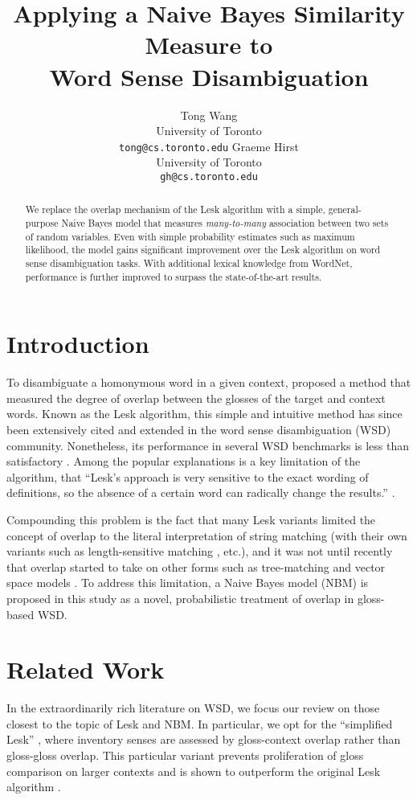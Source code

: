 \documentclass[11pt]{article}
\title{Applying a Naive Bayes Similarity Measure to\\Word Sense
  Disambiguation}
\author{Tong Wang \\
  University of Toronto\\
  {\tt tong@cs.toronto.edu} \And
  Graeme Hirst \\
  University of Toronto\\
  {\tt gh@cs.toronto.edu}}
\date{}
\begin{document}
\maketitle
\begin{abstract}
  We replace the overlap mechanism of the Lesk algorithm with a
  simple, general-purpose Naive Bayes model that measures
  \textit{many-to-many} association between two sets of random
  variables.  Even with simple probability estimates such as maximum
  likelihood, the model gains significant improvement over the Lesk
  algorithm on word sense disambiguation tasks. With additional
  lexical knowledge from WordNet, performance is further improved to
  surpass the state-of-the-art results.
\end{abstract}

\section{Introduction}
\label{sec:introduction}
To disambiguate a homonymous word in a given context,
\citet{lesk_automatic_1986} proposed a method that measured the degree
of overlap between the glosses of the target and context words.  Known
as the Lesk algorithm, this simple and intuitive method has since been
extensively cited and extended in the word sense disambiguation (WSD)
community. Nonetheless, its performance in several WSD benchmarks is
less than satisfactory
\citep{kilgarriff2000framework,vasilescu2004evaluating}. Among the
popular explanations is a key limitation of the algorithm, that
``Lesk's approach is very sensitive to the exact wording of
definitions, so the absence of a certain word can radically change the
results.''  \citep{navigli2009word}.

Compounding this problem is the fact that many Lesk variants limited
the concept of overlap to the literal interpretation of string
matching (with their own variants such as length-sensitive matching
\citep{banerjee2002adapted}, etc.), and it was not until recently that
overlap started to take on other forms such as tree-matching
\citep{Chen:2009:FUW:1620754.1620759} and vector space models
\citep{Abdalgader:2012:USW:2168748.2168750,raviv2012concept,patwardhan2006using}. To
address this limitation, a Naive Bayes model (NBM) is proposed in this
study as a novel, probabilistic treatment of overlap in gloss-based
WSD.

\section{Related Work}
\label{sec:related-work}
In the extraordinarily rich literature on WSD, we focus our review on
those closest to the topic of Lesk and NBM. In particular, we opt for
the ``simplified Lesk'' \citep{kilgarriff2000framework}, where
inventory senses are assessed by gloss-context overlap rather than
gloss-gloss overlap. This particular variant prevents proliferation of
gloss comparison on larger contexts \citep{mihalcea2004pagerank} and
is shown to outperform the original Lesk algorithm
\citep{vasilescu2004evaluating}.
\end{document}
